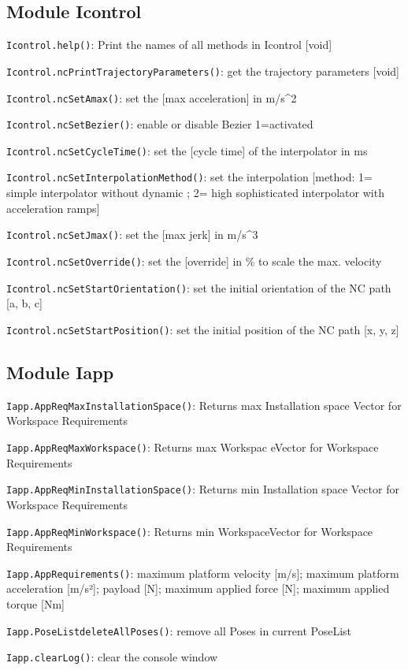 \documentclass[11pt,a4paper,onepage,openany]{book}
\begin{document}
\subsection{Module Icontrol }
\texttt{Icontrol.help()}: Print the names of all methods in Icontrol [void]

\texttt{Icontrol.ncPrintTrajectoryParameters()}: get the trajectory parameters [void]

\texttt{Icontrol.ncSetAmax()}: set the [max acceleration] in m/s\^{}2

\texttt{Icontrol.ncSetBezier()}: enable or disable Bezier 1=activated

\texttt{Icontrol.ncSetCycleTime()}: set the [cycle time] of the interpolator in ms

\texttt{Icontrol.ncSetInterpolationMethod()}: set the interpolation [method: 1= simple interpolator without dynamic ; 2= high sophisticated interpolator with acceleration ramps]

\texttt{Icontrol.ncSetJmax()}: set the [max jerk] in m/s\^{}3

\texttt{Icontrol.ncSetOverride()}: set the [override] in \% to scale the max. velocity

\texttt{Icontrol.ncSetStartOrientation()}: set the initial orientation of the NC path [a, b, c]

\texttt{Icontrol.ncSetStartPosition()}: set the initial position of the NC path [x, y, z]

\subsection{Module Iapp }
\texttt{Iapp.AppReqMaxInstallationSpace()}: Returns max Installation space
Vector for Workspace Requirements

\texttt{Iapp.AppReqMaxWorkspace()}: Returns max Workspac eVector for Workspace
Requirements

\texttt{Iapp.AppReqMinInstallationSpace()}: Returns min Installation space
Vector for Workspace Requirements

\texttt{Iapp.AppReqMinWorkspace()}: Returns min WorkspaceVector for Workspace
Requirements

\texttt{Iapp.AppRequirements()}: maximum platform velocity [m/s]; maximum
platform acceleration [m/s²]; payload [N]; maximum applied force [N]; maximum
applied torque [Nm]

\texttt{Iapp.PoseListdeleteAllPoses()}: remove all Poses in current PoseList

\texttt{Iapp.clearLog()}: clear the console window
\end{document}
